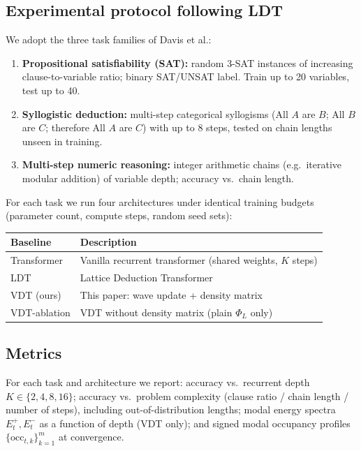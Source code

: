 \documentclass[12pt,a4paper]{article}
\theoremstyle{plain}
\theoremstyle{definition}
\theoremstyle{remark}
\newcommand{\1}{\mathbf{1}}
\newcommand{\VDT}{\textsc{VDT}}
\begin{document}
\subsection{Experimental protocol following LDT}

We adopt the three task families of Davis et al.:
\begin{enumerate}
  \item \textbf{Propositional satisfiability (SAT):} random 3-SAT
        instances of increasing clause-to-variable ratio; binary
        SAT/UNSAT label. Train up to 20 variables, test up to 40.
  \item \textbf{Syllogistic deduction:} multi-step categorical syllogisms
        (All $A$ are $B$; All $B$ are $C$; therefore All $A$ are $C$) with
        up to 8 steps, tested on chain lengths unseen in training.
  \item \textbf{Multi-step numeric reasoning:} integer arithmetic chains
        (e.g.\ iterative modular addition) of variable depth; accuracy
        vs.\ chain length.
\end{enumerate}

For each task we run four architectures under identical training budgets
(parameter count, compute steps, random seed sets):

\begin{center}
\begin{tabular}{ll}
\toprule
\textbf{Baseline} & \textbf{Description} \\
\midrule
Transformer & Vanilla recurrent transformer (shared weights, $K$ steps) \\
\textsc{LDT} & Lattice Deduction Transformer~\cite{davis2026ldt} \\
\VDT{} (ours) & This paper: wave update + density matrix \\
\VDT{}-ablation & \VDT{} without density matrix (plain $\Phi_L$ only) \\
\bottomrule
\end{tabular}
\end{center}

\subsection{Metrics}

For each task and architecture we report: accuracy vs.\ recurrent depth
$K \in \{2,4,8,16\}$; accuracy vs.\ problem complexity (clause ratio /
chain length / number of steps), including out-of-distribution lengths;
modal energy spectra $E_t^+, E_t^-$ as a function of depth (\VDT{} only);
and signed modal occupancy profiles
$\{\mathrm{occ}_{t,k}\}_{k=1}^m$ at convergence.
\end{document}
